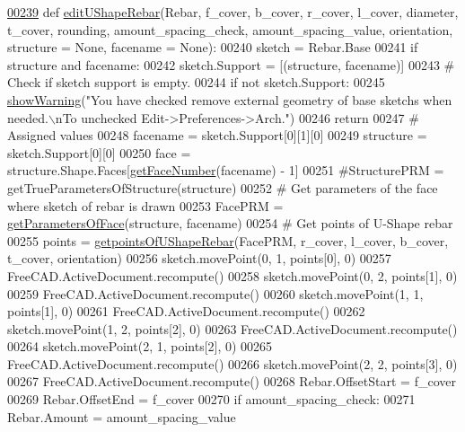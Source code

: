 \begin{DoxyCode}
\hypertarget{namespaceUShapeRebar.tex_l00239}{}\hyperlink{namespaceUShapeRebar_a461f60869fd97a93fc015af4828467ee}{00239} \textcolor{keyword}{def }\hyperlink{namespaceUShapeRebar_a461f60869fd97a93fc015af4828467ee}{editUShapeRebar}(Rebar, f\_cover, b\_cover, r\_cover, l\_cover, diameter, t\_cover, rounding, 
      amount\_spacing\_check, amount\_spacing\_value, orientation, structure = None, facename = None):
00240     sketch = Rebar.Base
00241     \textcolor{keywordflow}{if} structure \textcolor{keywordflow}{and} facename:
00242         sketch.Support = [(structure, facename)]
00243     \textcolor{comment}{# Check if sketch support is empty.}
00244     \textcolor{keywordflow}{if} \textcolor{keywordflow}{not} sketch.Support:
00245         \hyperlink{namespaceRebarfunc_a2278a0602d46a62953af1fcf2e574a94}{showWarning}(\textcolor{stringliteral}{"You have checked remove external geometry of base sketchs when needed.\(\backslash\)nTo
       unchecked Edit->Preferences->Arch."})
00246         \textcolor{keywordflow}{return}
00247     \textcolor{comment}{# Assigned values}
00248     facename = sketch.Support[0][1][0]
00249     structure = sketch.Support[0][0]
00250     face = structure.Shape.Faces[\hyperlink{namespaceRebarfunc_a3885b3b63e3a41508ac79bc7550cf301}{getFaceNumber}(facename) - 1]
00251     \textcolor{comment}{#StructurePRM = getTrueParametersOfStructure(structure)}
00252     \textcolor{comment}{# Get parameters of the face where sketch of rebar is drawn}
00253     FacePRM = \hyperlink{namespaceRebarfunc_a92122b3d7cedd3d47bb63380a5ac4d08}{getParametersOfFace}(structure, facename)
00254     \textcolor{comment}{# Get points of U-Shape rebar}
00255     points = \hyperlink{namespaceUShapeRebar_ac12ae9bce6b5211759f2fff4091b0221}{getpointsOfUShapeRebar}(FacePRM, r\_cover, l\_cover, b\_cover, t\_cover, 
      orientation)
00256     sketch.movePoint(0, 1, points[0], 0)
00257     FreeCAD.ActiveDocument.recompute()
00258     sketch.movePoint(0, 2, points[1], 0)
00259     FreeCAD.ActiveDocument.recompute()
00260     sketch.movePoint(1, 1, points[1], 0)
00261     FreeCAD.ActiveDocument.recompute()
00262     sketch.movePoint(1, 2, points[2], 0)
00263     FreeCAD.ActiveDocument.recompute()
00264     sketch.movePoint(2, 1, points[2], 0)
00265     FreeCAD.ActiveDocument.recompute()
00266     sketch.movePoint(2, 2, points[3], 0)
00267     FreeCAD.ActiveDocument.recompute()
00268     Rebar.OffsetStart = f\_cover
00269     Rebar.OffsetEnd = f\_cover
00270     \textcolor{keywordflow}{if} amount\_spacing\_check:
00271         Rebar.Amount = amount\_spacing\_value

\end{DoxyCode}
